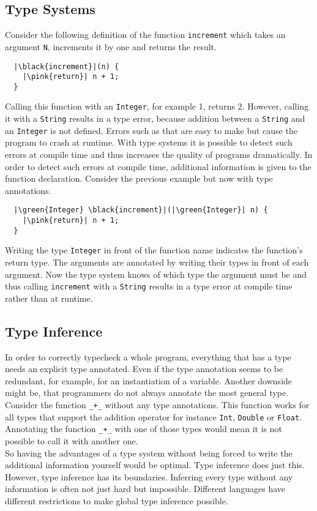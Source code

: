 \subsection{Type Systems}
Consider the following definition of the function \verb|increment| which takes an argument \verb|N|,
increments it by one and returns the result.
\begin{verbatim}
  |\black{increment}|(n) {
    |\pink{return}| n + 1;
  }
\end{verbatim}
Calling this function with an \verb|Integer|, for example 1, returns 2.
However, calling it with a \verb|String| results in a type error, because addition between a \verb|String|
and an \verb|Integer| is not defined.
Errors such as that are easy to make but cause the program to crash at runtime.
With type systems it is possible to detect such errors at compile time and thus increases the quality of programs dramatically.
In order to detect such errors at compile time, additional information is given to the function declaration.
Consider the previous example but now with type annotations.
\begin{verbatim}
  |\green{Integer} \black{increment}|(|\green{Integer}| n) {
    |\pink{return}| n + 1;
  }
\end{verbatim}
Writing the type \verb|Integer| in front of the function name indicates the function's return type.
The arguments are annotated by writing their types in front of each argument.
Now the type system knows of which type the argument must be and thus calling \verb|increment| with a \verb|String| results in a type error at compile time rather than at runtime.

\subsection{Type Inference}
In order to correctly typecheck a whole program, everything that has a type needs an explicit type annotated.
Even if the type annotation seems to be redundant, for example, for an instantiation of a variable.
Another downside might be, that programmers do not always annotate the most general type. Consider the function \verb|_+_| without any type annotations. This function works for all types that support the addition operator for instance \verb|Int|, \verb|Double| or \verb|Float|.
Annotating the function \verb|_+_| with one of those types would mean it is not possible to call it with another one.\\
So having the advantages of a type system without being forced to write the additional information yourself would be optimal. Type inference does just this.
However, type inference has its boundaries. Inferring every type without any information is often not just hard but impossible. Different languages have different restrictions to make global type inference possible.

